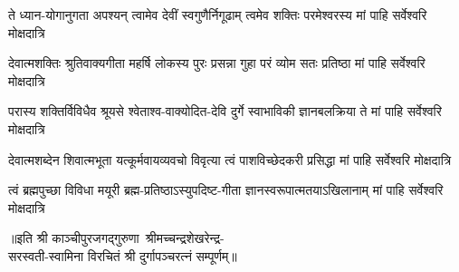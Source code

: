 

\fourlineindentedshloka
{ते ध्यान-योगानुगता अपश्यन्}
{त्वामेव देवीं स्वगुणैर्निगूढाम्}
{त्वमेव शक्तिः परमेश्वरस्य}
{मां पाहि सर्वेश्वरि मोक्षदात्रि}%

\fourlineindentedshloka
{देवात्मशक्तिः श्रुतिवाक्यगीता}
{महर्षि लोकस्य पुरः प्रसन्ना}
{गुहा परं व्योम सतः प्रतिष्ठा}
{मां पाहि सर्वेश्वरि मोक्षदात्रि}%

\fourlineindentedshloka
{परास्य शक्तिर्विविधैव श्रूयसे}
{श्वेताश्व-वाक्योदित-देवि दुर्गे}
{स्वाभाविकी ज्ञानबलक्रिया ते}
{मां पाहि सर्वेश्वरि मोक्षदात्रि}%

\fourlineindentedshloka
{देवात्मशब्देन शिवात्मभूता}
{यत्कूर्मवायव्यवचो विवृत्या}
{त्वं पाशविच्छेदकरी प्रसिद्धा}
{मां पाहि सर्वेश्वरि मोक्षदात्रि}%

\fourlineindentedshloka
{त्वं ब्रह्मपुच्छा विविधा मयूरी}
{ब्रह्म-प्रतिष्ठाऽस्युपदिष्ट-गीता}
{ज्ञानस्वरूपात्मतयाऽखिलानाम्}
{मां पाहि सर्वेश्वरि मोक्षदात्रि}%

{॥इति श्री काञ्चीपुरजगद्गुरुणा~श्रीमच्चन्द्रशेखरेन्द्र-\\सरस्वती-स्वामिना विरचितं श्री दुर्गापञ्चरत्नं सम्पूर्णम्॥}

